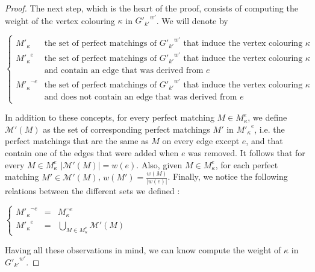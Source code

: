 \begin{proof}
    The next step, which is the heart of the proof, consists of computing the weight of the vertex colouring $\kappa$ in ${G'_{k'}}^{w'}$. We will denote by

    \begin{center}
        $\left\{
            \begin{array}{ll}
                M'_{\kappa}            & \mbox{the set of perfect matchings of } {G'_{k'}}^{w'} \mbox{ that induce the vertex colouring } \kappa \\
                {M'_{\kappa}}^e        & \mbox{the set of perfect matchings of } {G'_{k'}}^{w'} \mbox{ that induce the vertex colouring } \kappa \\
                                   & \mbox{and contain an edge that was derived from } e \\
                {M'_{\kappa}}^{\neg e} & \mbox{the set of perfect matchings of } {G'_{k'}}^{w'} \mbox{ that induce the vertex colouring } \kappa \\
                                   & \mbox{and does not contain an edge that was derived from } e
            \end{array}
        \right.$
    \end{center}
    
    In addition to these concepts, for every perfect matching $M \in M_{\kappa}^e$, we define $\mathcal{M}'(M)$ as the set of corresponding perfect matchings $M'$ in ${M'_{\kappa}}^e$, i.e. the perfect matchings that are the same as $M$ on every edge except $e$, and that contain one of the edges that were added when $e$ was removed. It follows that for every $M \in M_{\kappa}^e$ $|\mathcal{M}'(M)| = w(e)$. Also, given $M \in M_{\kappa}^e$, for each perfect matching $M' \in \mathcal{M}'(M)$, $w(M') = \frac{w(M)}{|w(e)|}$. Finally, we notice the following relations between the different sets we defined :

    \begin{center}
        $\left\{
            \begin{array}{lcl}
                {M'_{\kappa}}^{\neg e} & = & M_{\kappa}^{\neg e} \\
                {M'_{\kappa}}^e        & = & \bigcup\limits_{M \in M_{\kappa}^e} \mathcal{M}'(M) 
            \end{array}
        \right.$
    \end{center}

    Having all these observations in mind, we can know compute the weight of $\kappa$ in ${G'_{k'}}^{w'}$.


\end{proof}
